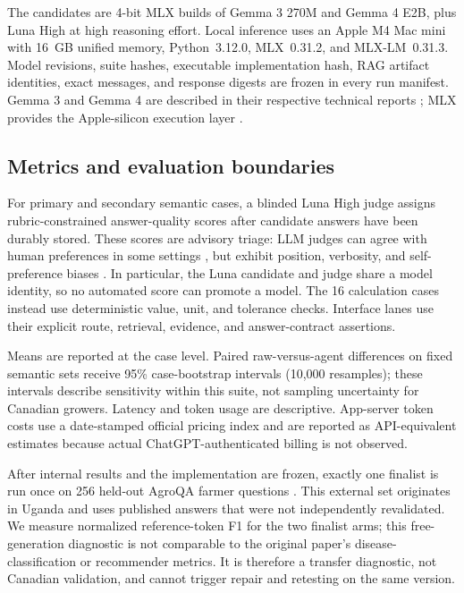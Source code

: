 \documentclass[9pt,twocolumn]{article}
\begin{document}
The candidates are 4-bit MLX builds of Gemma 3 270M and Gemma 4 E2B, plus Luna High at high reasoning effort. Local inference uses an Apple M4 Mac mini with 16~GB unified memory, Python~3.12.0, MLX~0.31.2, and MLX-LM~0.31.3. Model revisions, suite hashes, executable implementation hash, RAG artifact identities, exact messages, and response digests are frozen in every run manifest. Gemma 3 and Gemma 4 are described in their respective technical reports \citep{gemma3report,gemma4report}; MLX provides the Apple-silicon execution layer \citep{mlxframework}.

\subsection{Metrics and evaluation boundaries}

For primary and secondary semantic cases, a blinded Luna High judge assigns rubric-constrained answer-quality scores after candidate answers have been durably stored. These scores are advisory triage: LLM judges can agree with human preferences in some settings \citep{zheng2023judge}, but exhibit position, verbosity, and self-preference biases \citep{wataoka2024selfpreference}. In particular, the Luna candidate and judge share a model identity, so no automated score can promote a model. The 16 calculation cases instead use deterministic value, unit, and tolerance checks. Interface lanes use their explicit route, retrieval, evidence, and answer-contract assertions.

Means are reported at the case level. Paired raw-versus-agent differences on fixed semantic sets receive 95\% case-bootstrap intervals (10,000 resamples); these intervals describe sensitivity within this suite, not sampling uncertainty for Canadian growers. Latency and token usage are descriptive. App-server token costs use a date-stamped official pricing index and are reported as API-equivalent estimates because actual ChatGPT-authenticated billing is not observed.

After internal results and the implementation are frozen, exactly one finalist is run once on 256 held-out AgroQA farmer questions \citep{omara2023agroqa}. This external set originates in Uganda and uses published answers that were not independently revalidated. We measure normalized reference-token F1 for the two finalist arms; this free-generation diagnostic is not comparable to the original paper's disease-classification or recommender metrics. It is therefore a transfer diagnostic, not Canadian validation, and cannot trigger repair and retesting on the same version.
\end{document}
